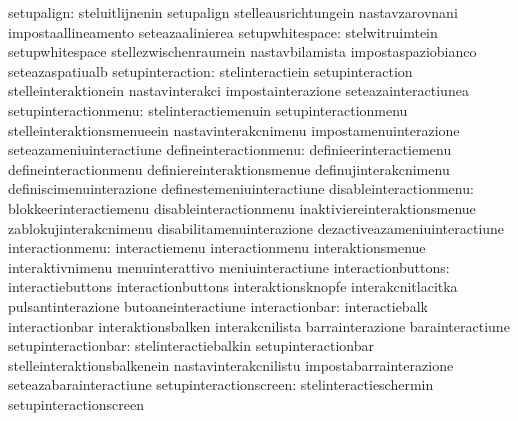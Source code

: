                       setupalign: steluitlijnenin                  setupalign
                                  stelleausrichtungein             nastavzarovnani
                                  impostaallineamento              seteazaalinierea
                 setupwhitespace: stelwitruimtein                  setupwhitespace
                                  stellezwischenraumein            nastavbilamista
                                  impostaspaziobianco              seteazaspatiualb
                setupinteraction: stelinteractiein                 setupinteraction
                                  stelleinteraktionein             nastavinterakci
                                  impostainterazione               seteazainteractiunea
            setupinteractionmenu: stelinteractiemenuin             setupinteractionmenu
                                  stelleinteraktionsmenueein       nastavinterakcnimenu
                                  impostamenuinterazione           seteazameniuinteractiune
           defineinteractionmenu: definieerinteractiemenu          defineinteractionmenu
                                  definiereinteraktionsmenue       definujinterakcnimenu
                                  definiscimenuinterazione         definestemeniuinteractiune
          disableinteractionmenu: blokkeerinteractiemenu           disableinteractionmenu
                                  inaktiviereinteraktionsmenue     zablokujinterakcnimenu
                                  disabilitamenuinterazione        dezactiveazameniuinteractiune
                 interactionmenu: interactiemenu                   interactionmenu
                                  interaktionsmenue                interaktivnimenu
                                  menuinterattivo                  meniuinteractiune
              interactionbuttons: interactiebuttons                interactionbuttons
                                  interaktionsknopfe               interakcnitlacitka
                                  pulsantinterazione               butoaneinteractiune
                  interactionbar: interactiebalk                   interactionbar
                                  interaktionsbalken               interakcnilista
                                  barrainterazione                 barainteractiune
             setupinteractionbar: stelinteractiebalkin             setupinteractionbar
                                  stelleinteraktionsbalkenein      nastavinterakcnilistu
                                  impostabarrainterazione          seteazabarainteractiune
          setupinteractionscreen: stelinteractieschermin           setupinteractionscreen
